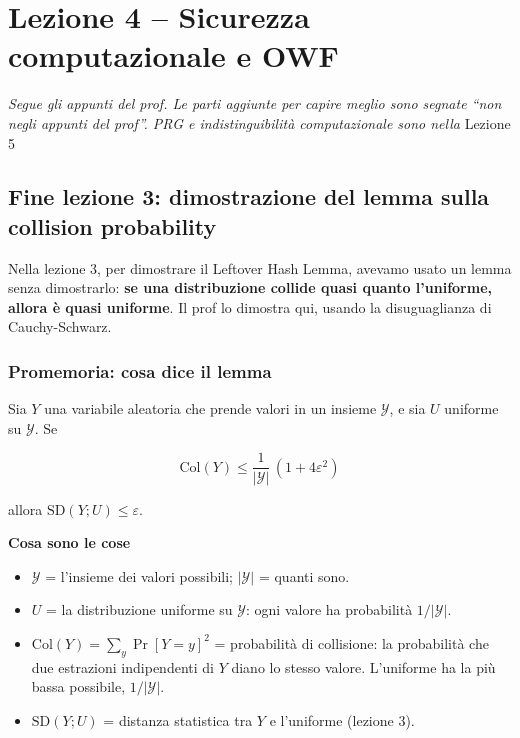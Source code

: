
\chapter{Lezione 4 -- Sicurezza computazionale e OWF}

\emph{Segue gli appunti del prof. Le parti aggiunte per capire meglio sono segnate ``non negli appunti del prof''. PRG e indistinguibilità computazionale sono nella} Lezione 5

\section{Fine lezione 3: dimostrazione del lemma sulla collision probability}

\begin{inbreve}

Nella lezione 3, per dimostrare il Leftover Hash Lemma, avevamo usato un lemma senza dimostrarlo: \textbf{se una distribuzione collide quasi quanto l'uniforme, allora è quasi uniforme}. Il prof lo dimostra qui, usando la disuguaglianza di Cauchy-Schwarz.

\end{inbreve}

\subsection{Promemoria: cosa dice il lemma}

Sia \(Y\) una variabile aleatoria che prende valori in un insieme \(\mathcal{Y}\), e sia \(U\) uniforme su \(\mathcal{Y}\). Se

\[
\text{Col}(Y) \le \frac{1}{|\mathcal{Y}|}\,(1 + 4\varepsilon^2)
\]

allora \(\text{SD}(Y; U) \le \varepsilon\).

\begin{nota}

\textbf{Cosa sono le cose}

\begin{itemize}
\tightlist
\item
  \(\mathcal{Y}\) = l'insieme dei valori possibili; \(|\mathcal{Y}|\) = quanti sono.
\item
  \(U\) = la distribuzione uniforme su \(\mathcal{Y}\): ogni valore ha probabilità \(1/|\mathcal{Y}|\).
\item
  \(\text{Col}(Y) = \sum_{y} \Pr[Y = y]^2\) = probabilità di collisione: la probabilità che due estrazioni indipendenti di \(Y\) diano lo stesso valore. L'uniforme ha la più bassa possibile, \(1/|\mathcal{Y}|\).
\item
  \(\text{SD}(Y; U)\) = distanza statistica tra \(Y\) e l'uniforme (lezione 3).
\end{itemize}

\end{nota}

